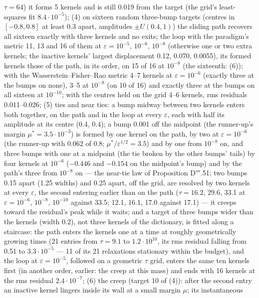 \begin{sloppypar}
$\tau = 64$) it forms 5 kernels and is still 0.019 from the target (the grid's least-squares fit $8.4\cdot10^{-5}$); (4)
on sixteen random three-bump targets (centres in $[-0.8,0.8]$ at least 0.3 apart, amplitudes $\pm U(0.4,1)$) the
sliding path recovers all sixteen exactly with three kernels and no exits; the loop with the paradigm's metric 11, 13
and 16 of them at $\varepsilon = 10^{-5}$, $10^{-6}$, $10^{-8}$ (otherwise one or two extra kernels; the inactive
kernels' largest displacement 0.12, 0.070, 0.0055), its formed kernels those of the path, in its order, on 15 of 16 at
$10^{-8}$ (the sixteenth: (6)); with the Wasserstein--Fisher--Rao metric 4--7 kernels at $\varepsilon = 10^{-6}$
(exactly three at the bumps on none), 3--5 at $10^{-8}$ (on 10 of 16) and exactly three at the bumps on all sixteen at
$10^{-10}$; with the centres held on the grid 4--6 kernels, rms residuals 0.011--0.026; (5) ties and near ties: a bump
midway between two kernels enters both together, on the path and in the loop at every $\varepsilon$, each with half its
amplitude at its centre (0.4, 0.4); a bump 0.001 off the midpoint (the runner-up's margin $\mu^* = 3.5\cdot10^{-3}$) is
formed by one kernel on the path, by two at $\varepsilon = 10^{-6}$ (the runner-up with 0.062 of 0.8;
$\mu^*/\varepsilon^{1/2} = 3.5$) and by one from $10^{-8}$ on, and three bumps with one at a midpoint (the tie broken
by the other bumps' tails) by four kernels at $10^{-6}$ ($-0.446$ and $-0.154$ on the midpoint's bump) and by the path's
three from $10^{-8}$ on --- the near-tie law of Proposition D$'''$.51; two bumps 0.15 apart (1.25 widths) and 0.25
apart, off the grid, are resolved by two kernels at every $\varepsilon$, the second entering earlier than on the path
($\tau = 16.2$, 29.6, 33.1 at $\varepsilon = 10^{-6}$, $10^{-8}$, $10^{-10}$ against 33.5; 12.1, 16.1, 17.0 against
17.1) --- it creeps toward the residual's peak while it waits; and a target of three bumps wider than the kernels (width
0.2), not three kernels of the dictionary, is fitted along a staircase: the path enters the kernels one at a time at
roughly geometrically growing times (21 entries from $\tau = 9.1$ to $1.2\cdot10^{10}$, its rms residual falling from
0.51 to $3.3\cdot10^{-5}$ --- 11 of its 21 relaxations stationary within the budget), and the loop at
$\varepsilon = 10^{-5}$, followed on a geometric $\tau$ grid, enters the same ten kernels first (in another order,
earlier: the creep at this mass) and ends with 16 kernels at the rms residual $2.4\cdot10^{-7}$; (6) the creep (target
10 of (4)): after the second entry an inactive kernel lingers inside its wall at a small margin $\mu$; its instantaneous

\end{sloppypar}
